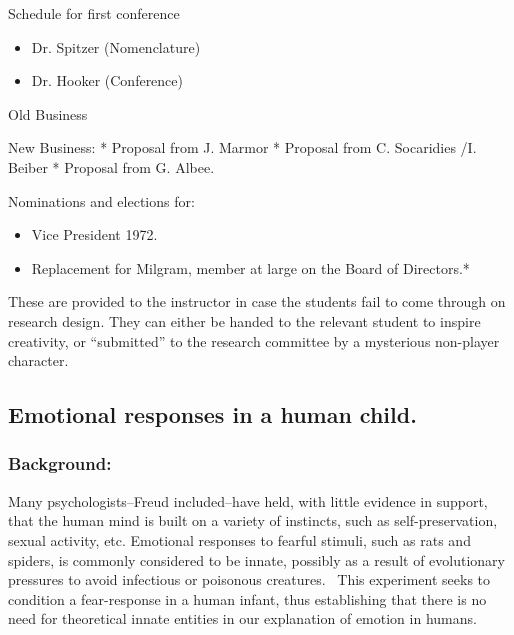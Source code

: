 \begin{refsection}
\begin{apatextbox}{Schedule for first conference}
\begin{itemize}
\item Dr. Spitzer (Nomenclature)

\item Dr. Hooker (Conference)

\end{itemize}

Old Business

New Business:
* Proposal from J. Marmor
 * Proposal from C. Socaridies \slash  I. Beiber
 * Proposal from G. Albee.

Nominations and elections for:

\begin{itemize}
\item Vice President 1972.

\item Replacement for Milgram, member at large on the Board of Directors.*

\end{itemize}

 \end{apatextbox}


 

\pagebreak 

These are provided to the instructor in case the students fail to come through on research design. They can either be handed to the relevant student to inspire creativity, or ``submitted'' to the research committee by a mysterious non-player character.

\newpage

\subsection{Emotional responses in a human child.}
\label{emotionalresponsesinahumanchild.}

\subsubsection{Background:}
\label{background:}

Many psychologists--Freud included--have held, with little evidence in support, that the human mind is built on a variety of instincts, such as self-preservation, sexual activity, etc. Emotional responses to fearful stimuli, such as rats and spiders, is commonly considered to be innate, possibly as a result of evolutionary pressures to avoid infectious or poisonous creatures.  This experiment seeks to condition a fear-response in a human infant, thus establishing that there is no need for theoretical innate entities in our explanation of emotion in humans.


\end{refsection}
